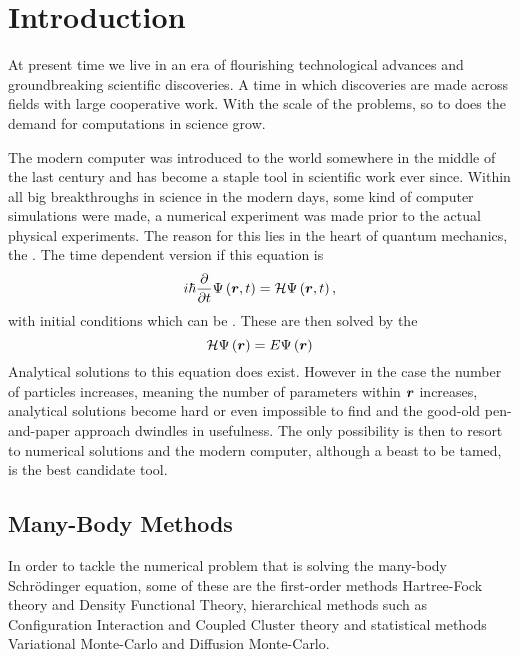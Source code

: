 \chapter{Introduction\label{chapter:1}}
    At present time we live in an era of flourishing technological advances and
    groundbreaking scientific discoveries. A time in which discoveries are made
    across fields with large cooperative work. With the scale of the problems,
    so to does the demand for computations in science grow.

    The modern computer was introduced to the world somewhere in the middle of
    the last century and has become a staple tool in scientific work ever
    since. Within all big breakthroughs in science in the modern days, some
    kind of computer simulations were made, a numerical experiment was made
    prior to the actual physical experiments. The reason for this lies in the
    heart of quantum mechanics, the . The time
    dependent version if this equation is
        \begin{equation}
            i\hbar \frac{\mathrm{\partial}}{\mathrm{\partial} t} \Psi\left(\boldsymbol{{r}},t\right) =
            \mathcal{H}\Psi\left(\boldsymbol{{r}},t\right),
        \end{equation}
    with initial conditions which can be . These are
    then solved by the 
        \begin{equation}
            \mathcal{H}\Psi\left(\boldsymbol{{r}}\right) = E\Psi\left(\boldsymbol{{r}}\right)
        \end{equation}
    Analytical solutions to this equation does exist. However in the case the
    number of particles increases, meaning the number of parameters within
    $\boldsymbol{{r}}$ increases, analytical solutions become hard or even impossible
    to find and the good-old pen-and-paper approach dwindles in usefulness.
    The only possibility is then to resort to numerical solutions and the
    modern computer, although a beast to be tamed, is the best candidate tool.

\section{Many-Body Methods}
    In order to tackle the numerical problem that is solving the many-body
    Schrödinger equation, some of these are the first-order methods
    Hartree-Fock theory and Density Functional Theory, hierarchical methods
    such as Configuration Interaction and Coupled Cluster theory and
    statistical methods Variational Monte-Carlo and Diffusion Monte-Carlo. 

